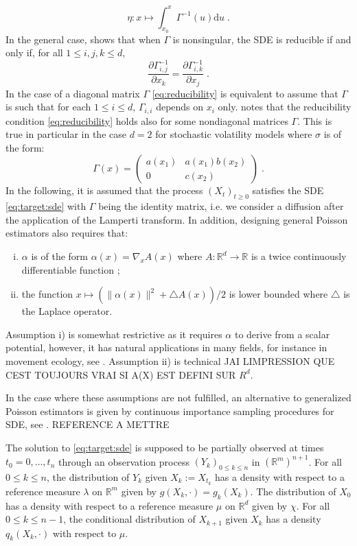 \documentclass[12pt]{article}
\newcommand{\eqsp}{\;}
\newcommand{\1}{\mathrm{1}}
\newcommand{\qk}{q_{k}}
\begin{document}
\[
\eta:x\mapsto \int_{x_0}^x\Gamma^{-1}(u)\mathrm{d}u\eqsp.
\]
In the general case, \cite[Proposition~$1$]{ait-sahalia:2008} shows that when $\Gamma$ is nonsingular, the SDE is reducible if and only if, for all $1\le i,j,k\le d$,
\begin{equation}
\label{eq:reducibility}
\frac{\partial\Gamma^{-1}_{i,j}}{\partial x_k} = \frac{\partial\Gamma^{-1}_{i,k}}{\partial x_j}\eqsp.
\end{equation}
In the case of a diagonal matrix $\Gamma$ \eqref{eq:reducibility} is equivalent to assume that $\Gamma$ is such that for each $1\le i\le d$, $\Gamma_{i,i}$ depends on $x_i$ only. \cite{ait-sahalia:2008} notes that the reducibility condition \eqref{eq:reducibility} holds also for some nondiagonal matrices $\Gamma$.
 This is true in particular in the case $d=2$ for stochastic volatility models where $\sigma$ is of the form:
\[
\Gamma(x) = \begin{pmatrix}a(x_1) & a(x_1)b(x_2)\\0&c(x_2)\end{pmatrix}\eqsp.
\]
In the following, it is assumed that the process $(X_t)_{t\ge 0}$ satisfies the SDE \eqref{eq:target:sde} with $\Gamma$ being the identity matrix, i.e. we consider a diffusion after the application of the Lamperti transform.
 In addition, designing general Poisson estimators also requires that:
\begin{enumerate}[i)]
\item $\alpha$ is of the form $\alpha(x) = \nabla_x A(x)$ where $A: \mathbb{R}^d \to \mathbb{R}$ is a twice continuously differentiable function ;
\item the function $x\mapsto \left(\|\alpha(x)\|^2  + \triangle A(x)\right)/2$ is lower bounded where $\triangle$ is the Laplace operator.
\end{enumerate}
Assumption i) is somewhat restrictive as it requires $\alpha$ to derive from a scalar potential, however, it has natural applications in many fields, for instance in movement ecology, see \cite{gloaguen:etienne:lecorff:2017}. Assumption ii) is technical {\color{red} JAI LIMPRESSION QUE CEST TOUJOURS VRAI SI A(X) EST DEFINI SUR $R^d$}.

{\color{red} In the case where these assumptions are not fulfilled, an alternative to generalized Poisson estimators is given by continuous importance sampling procedures for SDE, see \cite{}. REFERENCE A METTRE}

The solution to \eqref{eq:target:sde} is supposed to be partially observed at times $t_0=0,\dots,t_n$ through an observation process $(Y_k)_{0\le k \le n}$ in $(\mathbb{R}^m)^{n+1}$. 
For all $0\le k \le n$, the distribution of $Y_k$ given $X_k:= X_{t_k}$ has a density with respect to a reference measure $\lambda$ on $\mathbb{R}^m$ given by $g(X_k,\cdot) = g_k(X_k)$. 
The distribution of $X_0$ has a density with respect to a reference measure $\mu$ on $\mathbb{R}^d$ given by $\chi$.
For all $0\le k \le n-1$, the conditional distribution of $X_{k+1} $ given $X_{k}$ has a density $\qk(X_{k},\cdot)$ with respect to $\mu$.
 
\end{document}
